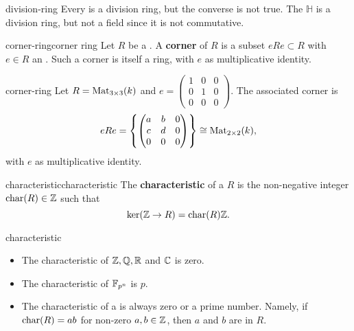 \begin{example}{division-ring}
    Every  is a division ring, but the converse is not true. The  $\mathbb{H}$ is a division ring, but not a field since it is not commutative.
\end{example}

\begin{topic}{corner-ring}{corner ring}
    Let $R$ be a . A \textbf{corner} of $R$ is a subset $eRe \subset R$ with $e \in R$ an . Such a corner is itself a ring, with $e$ as multiplicative identity.
\end{topic}

\begin{example}{corner-ring}
    Let $R = \textup{Mat}_{3 \times 3}(k)$ and $e = \begin{pmatrix} 1 & 0 & 0 \\ 0 & 1 & 0 \\ 0 & 0 & 0 \end{pmatrix}$. The associated corner is
    \[ eRe = \left\{ \begin{pmatrix} a & b & 0 \\ c & d & 0 \\ 0 & 0 & 0 \end{pmatrix} \right\} \cong \textup{Mat}_{2 \times 2}(k) , \]
    with $e$ as multiplicative identity.
\end{example}

\begin{topic}{characteristic}{characteristic}
    The \textbf{characteristic} of a  $R$ is the non-negative integer $\textup{char}(R) \in \mathbb{Z}$ such that
    \[ \ker(\mathbb{Z} \to R) = \textup{char}(R) \mathbb{Z} . \]
\end{topic}

\begin{example}{characteristic}
    \begin{itemize}
        \item The characteristic of $\mathbb{Z}, \mathbb{Q}, \mathbb{R}$ and $\mathbb{C}$ is zero.
        \item The characteristic of $\mathbb{F}_{p^n}$ is $p$.
        \item The characteristic of a  is always zero or a prime number. Namely, if $\textup{char}(R) = ab$ for non-zero $a, b \in \mathbb{Z}$, then $a$ and $b$ are  in $R$.
    \end{itemize}
\end{example}

